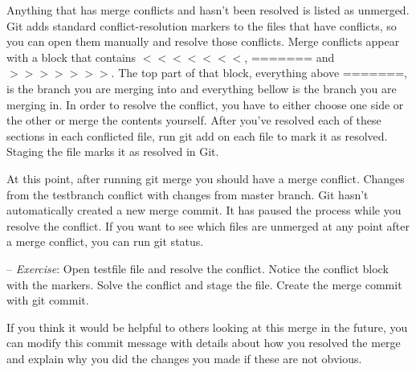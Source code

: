 \documentclass[12pt,a4]{article}
\newcommand{\ilcode}[1]{\textcolor[RGB]{160, 110, 220}{#1}}
\begin{document}
\begin{center}
\end{center}

Anything that has merge conflicts and hasn’t been resolved is listed as
unmerged. Git adds standard conflict-resolution markers to the files that have
conflicts, so you can open them manually and resolve those conflicts. Merge
conflicts appear with a block that contains \ilcode{$<<<<<<<$}, \ilcode{=======}
and \ilcode{$>>>>>>>$}. The top part of that block, everything above
\ilcode{=======}, is the branch you are merging into and everything bellow is
the branch you are merging in. In order to resolve the conflict, you have to
either choose one side or the other or merge the contents yourself. After you’ve
resolved each of these sections in each conflicted file, run \ilcode{git add} on
each file to mark it as resolved. Staging the file marks it as resolved in Git.

At this point, after running \ilcode{git merge} you should have a merge
conflict. Changes from the testbranch conflict with changes from master branch.
Git hasn’t automatically created a new merge commit. It has paused the process
while you resolve the conflict. If you want to see which files are unmerged at
any point after a merge conflict, you can run \ilcode{git status}.

{\sf -- \emph{Exercise}:} Open testfile file and resolve the conflict. Notice
the conflict block with the markers. Solve the conflict and stage the file.
Create the merge commit with \ilcode{git commit}.

If you think it would be helpful to others looking at this merge in the future,
you can modify this commit message with details about how you resolved the merge
and explain why you did the changes you made if these are not obvious.

\begin{center}
\end{center}
\end{document}

